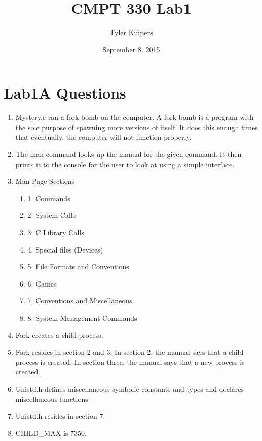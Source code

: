 \documentclass[12pt]{extarticle}
\title{CMPT 330 Lab1}
\author{Tyler Kuipers}
\date{September 8, 2015}
\begin{document}
	\maketitle
	\section*{Lab1A Questions}
		\begin{enumerate}
			\item Mystery.c ran a fork bomb on the computer.  A fork bomb is a program with the sole purpose of spawning more versions of itself.  It does this enough times that eventually, the computer will not function properly.
			\item The man command looks up the manual for the given command.  It then prints it to the console for the user to look at using a simple interface.
			\item Man Page Sections\begin{enumerate}
				\item 1. Commands
				\item 2. System Calls
				\item 3. C Library Calls
				\item 4. Special files (Devices)
				\item 5. File Formats and Conventions
				\item 6. Games
				\item 7. Conventions and Miscellaneous
				\item 8. System Management Commands
			\end{enumerate}
			\item Fork creates a child process.
			\item Fork resides in section 2 and 3. In section 2, the manual says that a child process is created.  In section three, the manual says that a new process is created.
			\item Unistd.h defines miscellaneous symbolic constants and types and declares miscellaneous functions.
			\item Unistd.h resides in section 7.
			\item CHILD\_MAX is 7350.
		\end{enumerate}
	\clearpage
\end{document}
